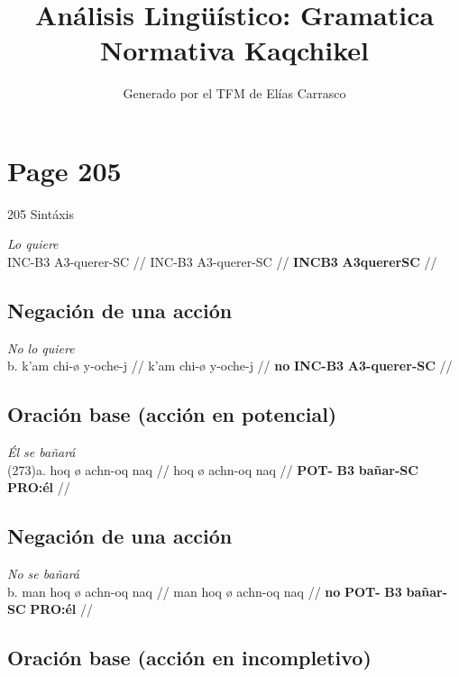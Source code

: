 \documentclass{article}%
\title{Análisis Lingüístico: Gramatica Normativa Kaqchikel}%
\author{Generado por el TFM de Elías Carrasco}%
\begin{document}
%
\normalsize%
\maketitle%
\section{Page 205}%
\label{sec:Page205}%
205 Sintáxis %
\par\medskip%
\ex
\textit{Lo quiere} \\
\begingl
\gla INC-B3 A3-querer-SC //
\glb INC-B3 A3-querer-SC //
\glc \textbf{INC}\textbf{B3} \textbf{A3}\textbf{querer}\textbf{SC} //
\endgl
\xe
%
\medskip%
\subsection{Negación de una acción}%
\label{subsec:Negacindeunaaccin}%

%
\par\medskip%
\ex
\textit{No lo quiere} \\
\begingl
\gla b. k’am chi-ø y-oche-j //
\glb k’am chi-ø y-oche-j //
\glc \textbf{no} \textbf{INC-}\textbf{B3} \textbf{A3-}\textbf{querer-}\textbf{SC} //
\endgl
\xe
%
\medskip%
\subsection{Oración base (acción en potencial)}%
\label{subsec:Oracinbase(accinenpotencial)}%

%
\par\medskip%
\ex
\textit{Él se bañará} \\
\begingl
\gla (273)a. hoq ø achn-oq naq //
\glb hoq ø achn-oq naq //
\glc \textbf{POT-} \textbf{B3} \textbf{bañar-}\textbf{SC} \textbf{PRO:él} //
\endgl
\xe
%
\medskip%
\subsection{Negación de una acción}%
\label{subsec:Negacindeunaaccin}%

%
\par\medskip%
\ex
\textit{No se bañará} \\
\begingl
\gla b. man hoq ø achn-oq naq //
\glb man hoq ø achn-oq naq //
\glc \textbf{no} \textbf{POT-} \textbf{B3} \textbf{bañar-}\textbf{SC} \textbf{PRO:él} //
\endgl
\xe
%
\medskip%
\subsection{Oración base (acción en incompletivo)}%
\label{subsec:Oracinbase(accinenincompletivo)}%
\end{document}

